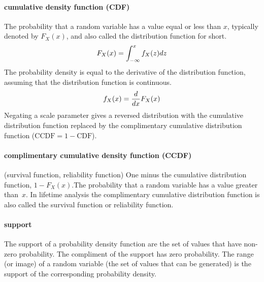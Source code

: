 \paragraph*{cumulative density function (CDF)} 
The probability that a random variable has a value equal or less than $x$, typically denoted by $F_X(x)$, and also called the distribution function for short.
\[
F_X(x) = \int^x_{-\infty} f_X(z) dz 
\notag
\]
The probability density is equal to the derivative of the distribution function, assuming that the distribution function is continuous.
\[
f_X(x) = \frac{d}{dx} F_X(x) 
\notag
\]
Negating a scale parameter gives a reversed distribution with the cumulative distribution function replaced by the complimentary cumulative distribution function ($\text{CCDF}=1-\text{CDF}$).



\paragraph*{complimentary cumulative density function (CCDF)}  (survival function, reliability function)
One minus the cumulative distribution function,  $1-F_X(x)$.\checked The probability that a random variable has a value greater than~$x$. In lifetime analysis the complimentary cumulative distribution function is also called the survival function or reliability function.



\paragraph*{support}
The support of a probability density function are the set of values that have non-zero probability. The compliment of the support has zero probability. The range (or image) of a random variable (the set of values that can be generated) is the support of the corresponding probability density.



